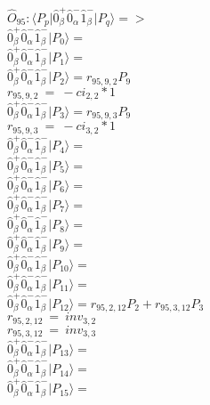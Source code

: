 \documentclass[14pt]{article}
\begin{document}
    $\hat{O}_{95}:  \langle{P_p}\vert \hat{0}_{\beta}^{+}\hat{0}_{\alpha}^{-}\hat{1}_{\beta}^{-} \vert{P_q}\rangle => $ \\ 
    $ \hat{0}_{\beta}^{+}\hat{0}_{\alpha}^{-}\hat{1}_{\beta}^{-} \vert{P_{0}}\rangle =  $ \\ 
    $ \hat{0}_{\beta}^{+}\hat{0}_{\alpha}^{-}\hat{1}_{\beta}^{-} \vert{P_{1}}\rangle =  $ \\ 
    $ \hat{0}_{\beta}^{+}\hat{0}_{\alpha}^{-}\hat{1}_{\beta}^{-} \vert{P_{2}}\rangle = {r}_{95,9,2}P_{9} $ \\ 
    ${r}_{95,9,2}\ =\ -{ci}_{2,2}*1 $ \\ 
    $ \hat{0}_{\beta}^{+}\hat{0}_{\alpha}^{-}\hat{1}_{\beta}^{-} \vert{P_{3}}\rangle = {r}_{95,9,3}P_{9} $ \\ 
    ${r}_{95,9,3}\ =\ -{ci}_{3,2}*1 $ \\ 
    $ \hat{0}_{\beta}^{+}\hat{0}_{\alpha}^{-}\hat{1}_{\beta}^{-} \vert{P_{4}}\rangle =  $ \\ 
    $ \hat{0}_{\beta}^{+}\hat{0}_{\alpha}^{-}\hat{1}_{\beta}^{-} \vert{P_{5}}\rangle =  $ \\ 
    $ \hat{0}_{\beta}^{+}\hat{0}_{\alpha}^{-}\hat{1}_{\beta}^{-} \vert{P_{6}}\rangle =  $ \\ 
    $ \hat{0}_{\beta}^{+}\hat{0}_{\alpha}^{-}\hat{1}_{\beta}^{-} \vert{P_{7}}\rangle =  $ \\ 
    $ \hat{0}_{\beta}^{+}\hat{0}_{\alpha}^{-}\hat{1}_{\beta}^{-} \vert{P_{8}}\rangle =  $ \\ 
    $ \hat{0}_{\beta}^{+}\hat{0}_{\alpha}^{-}\hat{1}_{\beta}^{-} \vert{P_{9}}\rangle =  $ \\ 
    $ \hat{0}_{\beta}^{+}\hat{0}_{\alpha}^{-}\hat{1}_{\beta}^{-} \vert{P_{10}}\rangle =  $ \\ 
    $ \hat{0}_{\beta}^{+}\hat{0}_{\alpha}^{-}\hat{1}_{\beta}^{-} \vert{P_{11}}\rangle =  $ \\ 
    $ \hat{0}_{\beta}^{+}\hat{0}_{\alpha}^{-}\hat{1}_{\beta}^{-} \vert{P_{12}}\rangle = {r}_{95,2,12}P_{2}+{r}_{95,3,12}P_{3} $ \\ 
    ${r}_{95,2,12}\ =\ {inv}_{3,2} $ \\ 
    ${r}_{95,3,12}\ =\ {inv}_{3,3} $ \\ 
    $ \hat{0}_{\beta}^{+}\hat{0}_{\alpha}^{-}\hat{1}_{\beta}^{-} \vert{P_{13}}\rangle =  $ \\ 
    $ \hat{0}_{\beta}^{+}\hat{0}_{\alpha}^{-}\hat{1}_{\beta}^{-} \vert{P_{14}}\rangle =  $ \\ 
    $ \hat{0}_{\beta}^{+}\hat{0}_{\alpha}^{-}\hat{1}_{\beta}^{-} \vert{P_{15}}\rangle =  $ \\ 
    
\end{document}
